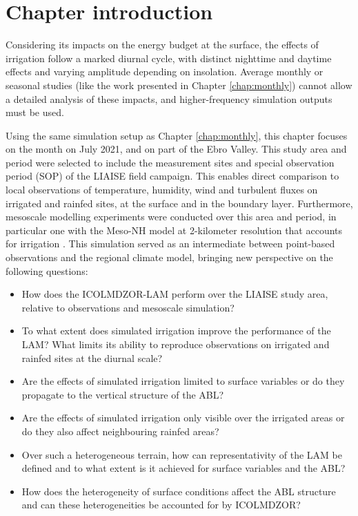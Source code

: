 \section{Chapter introduction}

Considering its impacts on the energy budget at the surface, the effects of irrigation follow a marked diurnal cycle, with distinct nighttime and daytime effects and varying amplitude depending on insolation. 
Average monthly or seasonal studies (like the work presented in Chapter \ref{chap:monthly}) cannot allow a detailed analysis of these impacts, and higher-frequency simulation outputs must be used.

Using the same simulation setup as Chapter \ref{chap:monthly}, this chapter focuses on the month on July 2021, and on part of the Ebro Valley. This study area and period were selected to include the measurement sites and special observation period (SOP) of the LIAISE field campaign. This enables direct comparison to local observations of temperature, humidity, wind and turbulent fluxes on irrigated and rainfed sites, at the surface and in the boundary layer. Furthermore, mesoscale modelling experiments were conducted over this area and period, in particular one with the Meso-NH model at 2-kilometer resolution that accounts for irrigation \citep{lunel_irrigation_2024}. This simulation served as an intermediate between point-based observations and the regional climate model, bringing new perspective on the following questions:

\begin{itemize}
    \item How does the ICOLMDZOR-LAM perform over the LIAISE study area, relative to observations and mesoscale simulation?
    \item To what extent does simulated irrigation improve the performance of the LAM? What limits its ability to reproduce observations on irrigated and rainfed sites at the diurnal scale?
    \item Are the effects of simulated irrigation limited to surface variables or do they propagate to the vertical structure of the ABL? 
    \item Are the effects of simulated irrigation only visible over the irrigated areas or do they also affect neighbouring rainfed areas?
    \item Over such a heterogeneous terrain, how can representativity of the LAM be defined and to what extent is it achieved for surface variables and the ABL?
    \item How does the heterogeneity of surface conditions affect the ABL structure and can these heterogeneities be accounted for by ICOLMDZOR?
\end{itemize}


